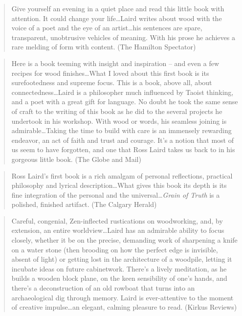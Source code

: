 \documentclass[10pt,DIV09,letterpaper,oneside,headsepline]{scrreprt}
\begin{document}
\begin{quotation} Give yourself an evening in a quiet place and read this little book with attention. It could change your life\ldots Laird writes about wood with the voice of a poet and the eye of an artist\ldots his sentences are spare, transparent, unobtrusive vehicles of meaning. With his prose he achieves a rare melding of form with content. (The Hamilton Spectator) \end{quotation}

\begin{quotation} Here is a book teeming with insight and inspiration -- and even a few recipes for wood finishes\ldots What I loved about this first book is its surefootedness and supreme focus. This is a book, above all, about connectedness\ldots Laird is a philosopher much influenced by Taoist thinking, and a poet with a great gift for language. No doubt he took the same sense of craft to the writing of this book as he did to the several projects he undertook in his workshop. With wood or words, his seamless joining is admirable\ldots Taking the time to build with care is an immensely rewarding endeavor, an act of faith and trust and courage. It's a notion that most of us seem to have forgotten, and one that Ross Laird takes us back to in his gorgeous little book. (The Globe and Mail) \end{quotation}


\begin{quotation} Ross Laird's first book is a rich amalgam of personal reflections, practical philosophy and lyrical description\ldots What gives this book its depth is its fine integration of the personal and the universal\ldots \textit{Grain of Truth} is a polished, finished artifact. (The Calgary Herald) \end{quotation}


\begin{quotation} Careful, congenial, Zen-inflected rustications on woodworking, and, by extension, an entire worldview…Laird has an admirable ability to focus closely, whether it be on the precise, demanding work of sharpening a knife on a water stone (then brooding on how the perfect edge is invisible, absent of light) or getting lost in the architecture of a woodpile, letting it incubate ideas on future cabinetwork. There's a lively meditation, as he builds a wooden block plane, on the keen sensibility of one's hands, and there's a deconstruction of an old rowboat that turns into an archaeological dig through memory. Laird is ever-attentive to the moment of creative impulse\ldots an elegant, calming pleasure to read. (Kirkus Reviews) \end{quotation}
\end{document}
